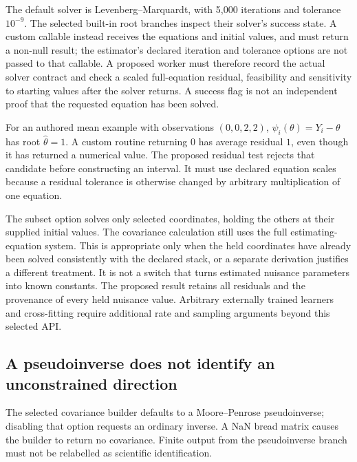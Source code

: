 The default solver is Levenberg--Marquardt, with 5,000 iterations and
tolerance $10^{-9}$. The selected built-in root branches inspect their
solver's success state. A custom callable instead receives the equations
and initial values, and must return a non-null result; the estimator's
declared iteration and tolerance options are not passed to that callable.
A proposed worker must therefore record the actual solver contract and
check a scaled full-equation residual, feasibility and sensitivity to
starting values after the solver returns. A success flag is not an
independent proof that the requested equation has been solved.
\citep{exec24_delicatessen_source,exec24_delicatessen_choice}

For an authored mean example with observations $(0,0,2,2)$,
$\psi_i(\theta)=Y_i-\theta$ has root $\widehat\theta=1$.
A custom routine returning $0$ has average residual $1$, even though
it has returned a numerical value. The proposed residual test rejects
that candidate before constructing an interval. It must use declared
equation scales because a residual tolerance is otherwise changed by
arbitrary multiplication of one equation.~\citep{exec24_delicatessen_choice}

The subset option solves only selected coordinates, holding the others
at their supplied initial values. The covariance calculation still uses
the full estimating-equation system. This is appropriate only when the
held coordinates have already been solved consistently with the declared
stack, or a separate derivation justifies a different treatment. It is
not a switch that turns estimated nuisance parameters into known constants.
The proposed result retains all residuals and the provenance of every
held nuisance value. Arbitrary externally trained learners and cross-fitting
require additional rate and sampling arguments beyond this selected API.
\citep{exec24_delicatessen_source,exec24_delicatessen_choice}

\subsection{A pseudoinverse does not identify an unconstrained direction}
The selected covariance builder defaults to a Moore--Penrose pseudoinverse;
disabling that option requests an ordinary inverse. A NaN bread matrix
causes the builder to return no covariance. Finite output from the
pseudoinverse branch must not be relabelled as scientific identification.
\citep{exec24_delicatessen_source}

